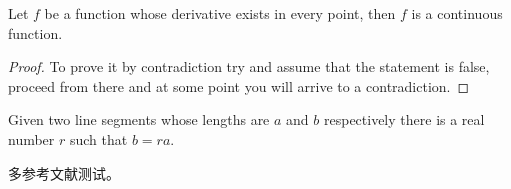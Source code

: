 \begin{theorem}
    Let $f$ be a function whose derivative exists in every point, then $f$
    is a continuous function.
\end{theorem}

\begin{proof}
    To prove it by contradiction try and assume that the statement is false,
    proceed from there and at some point you will arrive to a contradiction.
\end{proof}

\begin{lemma}
    Given two line segments whose lengths are $a$ and $b$ respectively there
    is a real number $r$ such that $b=ra$.
\end{lemma}

多参考文献测试\cite{hui2015_177_179,lei2017,Mei2010The}。
